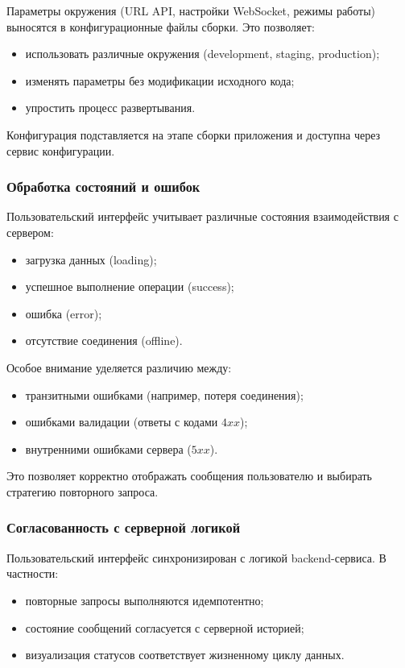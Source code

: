 \documentclass{article}
\begin{document}
Параметры окружения (URL API, настройки WebSocket, режимы работы) выносятся в конфигурационные файлы сборки. Это позволяет:
\begin{itemize}
\item использовать различные окружения (development, staging, production);
\item изменять параметры без модификации исходного кода;
\item упростить процесс развертывания.
\end{itemize}

Конфигурация подставляется на этапе сборки приложения и доступна через сервис конфигурации.

\subsubsection{Обработка состояний и ошибок}

Пользовательский интерфейс учитывает различные состояния взаимодействия с сервером:
\begin{itemize}
\item загрузка данных (loading);
\item успешное выполнение операции (success);
\item ошибка (error);
\item отсутствие соединения (offline).
\end{itemize}

Особое внимание уделяется различию между:
\begin{itemize}
\item транзитными ошибками (например, потеря соединения);
\item ошибками валидации (ответы с кодами $4xx$);
\item внутренними ошибками сервера ($5xx$).
\end{itemize}

Это позволяет корректно отображать сообщения пользователю и выбирать стратегию повторного запроса.

\subsubsection{Согласованность с серверной логикой}

Пользовательский интерфейс синхронизирован с логикой backend-сервиса. В частности:
\begin{itemize}
\item повторные запросы выполняются идемпотентно;
\item состояние сообщений согласуется с серверной историей;
\item визуализация статусов соответствует жизненному циклу данных.
\end{itemize}
\end{document}
